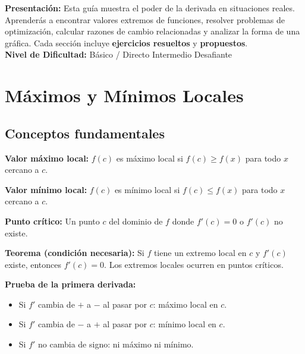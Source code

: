 \documentclass[12pt, a4paper]{article}
\begin{document}


\begin{cuadroinfo}
  \small
  \textbf{Presentación:} Esta guía muestra el poder de la derivada en situaciones reales. Aprenderás a encontrar valores extremos de funciones, resolver problemas de optimización, calcular razones de cambio relacionadas y analizar la forma de una gráfica. Cada sección incluye \textbf{ejercicios resueltos} y \textbf{propuestos}.
  \\[4pt]
  \textbf{Nivel de Dificultad:}\quad
  \facil{} Básico / Directo \quad
  \medio{} Intermedio \quad
  \dificil{} Desafiante
\end{cuadroinfo}

\vspace{4pt}

\section{Máximos y Mínimos Locales}

\subsection{Conceptos fundamentales}

\begin{cuadroteoria}
  \textbf{Valor máximo local:} $f(c)$ es máximo local si $f(c) \geq f(x)$ para todo $x$ cercano a $c$.

  \textbf{Valor mínimo local:} $f(c)$ es mínimo local si $f(c) \leq f(x)$ para todo $x$ cercano a $c$.

  \textbf{Punto crítico:} Un punto $c$ del dominio de $f$ donde $f'(c) = 0$ o $f'(c)$ no existe.

  \textbf{Teorema (condición necesaria):} Si $f$ tiene un extremo local en $c$ y $f'(c)$ existe, entonces $f'(c) = 0$. Los extremos locales ocurren en puntos críticos.
\end{cuadroteoria}

\begin{cuadrosolucion}
  \textbf{Prueba de la primera derivada:}
  \begin{itemize}[leftmargin=*]
    \item Si $f'$ cambia de $+$ a $-$ al pasar por $c$: máximo local en $c$.
    \item Si $f'$ cambia de $-$ a $+$ al pasar por $c$: mínimo local en $c$.
    \item Si $f'$ no cambia de signo: ni máximo ni mínimo.
  \end{itemize}
\end{cuadrosolucion}
\end{document}
